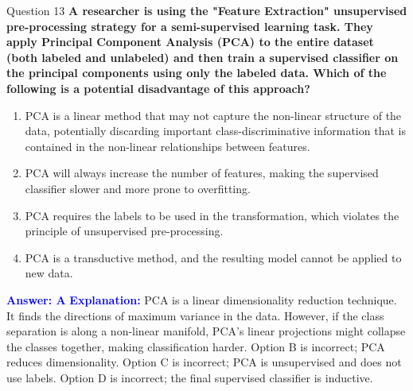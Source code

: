 \documentclass{beamer}
\begin{document}
	\begin{frame}{Question 13}
		\textbf{A researcher is using the "Feature Extraction" unsupervised pre-processing strategy for a semi-supervised learning task. They apply Principal Component Analysis (PCA) to the entire dataset (both labeled and unlabeled) and then train a supervised classifier on the principal components using only the labeled data. Which of the following is a potential disadvantage of this approach?}
		\begin{enumerate}
			\item PCA is a linear method that may not capture the non-linear structure of the data, potentially discarding important class-discriminative information that is contained in the non-linear relationships between features.
			\item PCA will always increase the number of features, making the supervised classifier slower and more prone to overfitting.
			\item PCA requires the labels to be used in the transformation, which violates the principle of unsupervised pre-processing.
			\item PCA is a transductive method, and the resulting model cannot be applied to new data.
		\end{enumerate}
		\vspace{0.2cm}
		\textcolor{blue}{\textbf{Answer: A}}
		\vspace{0.2cm}
		\textcolor{blue}{\textbf{Explanation:}} PCA is a linear dimensionality reduction technique. It finds the directions of maximum variance in the data. However, if the class separation is along a non-linear manifold, PCA's linear projections might collapse the classes together, making classification harder. Option B is incorrect; PCA reduces dimensionality. Option C is incorrect; PCA is unsupervised and does not use labels. Option D is incorrect; the final supervised classifier is inductive.
	\end{frame}
	
\end{document}

